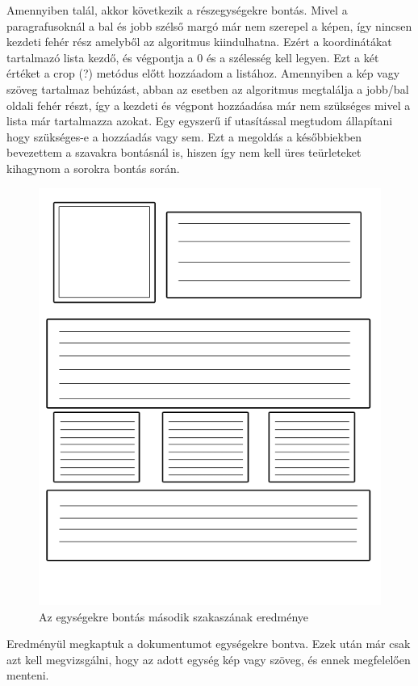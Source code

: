 Amennyiben talál, akkor következik a részegységekre bontás. Mivel a paragrafusoknál a bal és jobb szélső margó már nem szerepel a képen, így nincsen kezdeti fehér rész amelyből az algoritmus kiindulhatna. Ezért a koordinátákat tartalmazó lista kezdő, és végpontja a 0 és a szélesség kell legyen. Ezt a két értéket a crop (?) metódus előtt hozzáadom a listához. Amennyiben a kép vagy szöveg tartalmaz behúzást, abban az esetben az algoritmus megtalálja a jobb/bal oldali fehér részt, így a kezdeti és végpont hozzáadása már nem szükséges mivel a lista már tartalmazza azokat. Egy egyszerű if utasítással megtudom állapítani hogy szükséges-e a hozzáadás vagy sem. Ezt a megoldás a későbbiekben bevezettem a szavakra bontásnál is, hiszen így nem kell üres teürleteket kihagynom a sorokra bontás során.

\begin{figure}[H]
\centering
\includegraphics[scale=1]{images/page3.png}
\caption{Az egységekre bontás második szakaszának eredménye}
\label{fig:page 3}
\end{figure}

Eredményül megkaptuk a dokumentumot egységekre bontva. Ezek után már csak azt kell megvizsgálni, hogy az adott egység kép vagy szöveg, és ennek megfelelően menteni.

